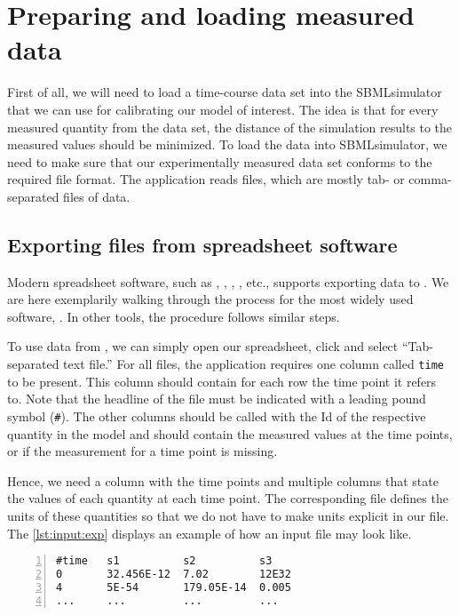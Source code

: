\section{Preparing and loading measured data}
\label{ch:prepare}

First of all, we will need to load a time-course data set into the SBMLsimulator that we can use for calibrating our model of interest.
The idea is that for every measured quantity from the data set, the distance of the simulation results to the measured values should be minimized.
To load the data into SBMLsimulator, we need to make sure that our experimentally measured data set conforms to the required file format.
The application reads \CSV files, which are mostly tab- or comma-separated files of data.

\subsection{Exporting \CSV files from spreadsheet software}
\label{sec:CSVformat}

Modern spreadsheet software, such as \Excel, \GoogleTables, \LibreCalc, \AppleNumbers, etc., supports exporting data to \CSV.
We are here exemplarily walking through the process for the most widely used software, \Excel.
In other tools, the procedure follows similar steps.

To use data from \Excel, we can simply open our \Excel spreadsheet, click  and select ``Tab-separated text file.''
For all files, the application requires one column called \texttt{time} to be present.
This column should contain for each row the time point it refers to.
Note that the headline of the file must be indicated with a leading pound symbol (\texttt{\#}).
The other columns should be called with the \ac{Id} of the respective quantity in the model and should contain the measured values at the time points, or \NaN if the measurement for a time point is missing. 

Hence, we need a column with the time points and multiple columns that state the values
of each quantity at each time point.
The corresponding \SBML file defines the units of these quantities so that we do not have to make units explicit in our \CSV file.
The \cref{lst:input:exp} displays an example of how an input file may look like.
\begin{lstlisting}[caption={Input file example for experimental data},label={lst:input:exp},numbers=left,captionpos=t,float=t]
#time   s1          s2          s3
0       32.456E-12  7.02        12E32
4       5E-54       179.05E-14  0.005
...     ...         ...         ...
\end{lstlisting}


